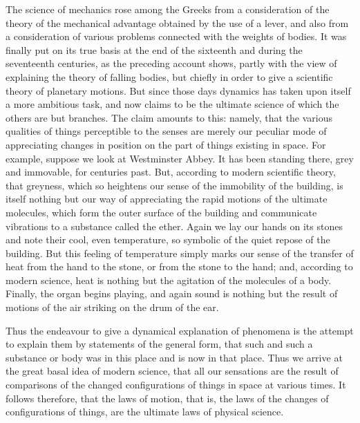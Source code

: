 \documentclass[12pt,leqno]{book}[2005/09/16]
\newcommand{\PageSep}[1]{\ignorespaces}
\begin{document}
The science of mechanics rose among the
%
Greeks from a consideration of the theory of
the mechanical advantage obtained by the use
\PageSep{47}
%
of a lever, and also from a consideration of
various problems connected with the weights
of bodies. It was finally put on its true basis
at the end of the sixteenth and during the
seventeenth centuries, as the preceding account
shows, partly with the view of explaining
the theory of falling bodies, but chiefly
in order to give a scientific theory of planetary
motions. But since those days dynamics has
taken upon itself a more ambitious task, and
now claims to be the ultimate science of which
the others are but branches. The claim
amounts to this: namely, that the various
qualities of things perceptible to the senses
are merely our peculiar mode of appreciating
changes in position on the part of things
existing in space. For example, suppose we
look at Westminster Abbey. It has been
standing there, grey and immovable, for centuries
past. But, according to modern scientific
theory, that greyness, which so heightens
our sense of the immobility of the building, is
itself nothing but our way of appreciating the
rapid motions of the ultimate molecules, which
form the outer surface of the building and
communicate vibrations to a substance called
the ether. Again we lay our hands on its
stones and note their cool, even temperature,
so symbolic of the quiet repose of the building.
But this feeling of temperature simply marks
our sense of the transfer of heat from the
\PageSep{48}
hand to the stone, or from the stone to the
hand; and, according to modern science,
heat is nothing but the agitation of the molecules
of a body. Finally, the organ begins
playing, and again sound is nothing but the
result of motions of the air striking on the
drum of the ear.

Thus the endeavour to give a dynamical
explanation of phenomena is the attempt to
explain them by statements of the general
form, that such and such a substance or body
was in this place and is now in that place.
Thus we arrive at the great basal idea of
modern science, that all our sensations are
the result of comparisons of the changed
configurations of things in space at various
times. It follows therefore, that the laws
of motion, that is, the laws of the changes
of configurations of things, are the ultimate
laws of physical science.
\end{document}

